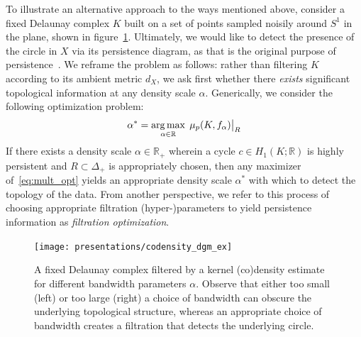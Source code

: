 \documentclass[10pt]{article}
\numberwithin{equation}{section}
\newcommand{\+}{%
	\raisebox{0.18ex}{\scaleobj{0.55}{+}}
}
\DeclareMathOperator*{\argmax}{arg\,max}
\newcommand\restr[2]{{%
  \left.\kern-\nulldelimiterspace %
  #1 %
  \vphantom{\big|} %
  \right|_{#2} %
  }}
\theoremstyle{definition}
\theoremstyle{definition}
\begin{document}
To illustrate an alternative approach to the ways mentioned above, consider a fixed Delaunay complex $K$ built on a set of points sampled noisily around $S^1$ in the plane, shown in figure~\ref{fig:codensity}. Ultimately, we would like to detect the presence of the circle in $X$ via its persistence diagram, as that is the original purpose of persistence~\cite{}. 
We reframe the problem as follows: rather than filtering $K$ according to its ambient metric $d_X$, we ask first whether there \emph{exists} significant topological information at any density scale $\alpha$. Generically, we consider the following optimization problem:   
\begin{equation}\label{eq:mult_opt}
	\alpha^\ast = \argmax_{\alpha \in \mathbb{R}} \; 
	\restr{\mu_p(K, f_\alpha)}{R}
\end{equation}
If there exists a density scale $\alpha \in \mathbb{R}_+$ wherein a cycle $c \in H_1(K ; \mathbb{R})$ is highly persistent and $R \subset \Delta_+$ is appropriately chosen, then any maximizer of~\eqref{eq:mult_opt} yields an appropriate density scale $\alpha^\ast$ with which to detect the topology of the data. 
From another perspective, we refer to this process of choosing appropriate filtration (hyper-)parameters to yield persistence information as \emph{filtration optimization}. 

\begin{figure}[ht]
	\centering
	\texttt{[image: presentations/codensity\_dgm\_ex]}
	\caption{A fixed Delaunay complex filtered by a kernel (co)density estimate for different bandwidth parameters $\alpha$. Observe that either too small (left) or too large (right) a choice of bandwidth can obscure the underlying topological structure, whereas an appropriate choice of bandwidth creates a filtration that detects the underlying circle. 
	}\label{fig:codensity}
\end{figure}
\end{document}
